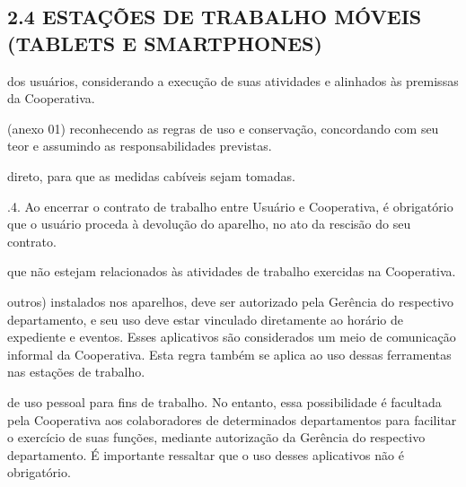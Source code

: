 \documentclass[letterpaper,10pt,brazil]{sphinxmanual}
\begin{document}
\subsection{2.4 ESTAÇÕES DE TRABALHO MÓVEIS (TABLETS E SMARTPHONES)}
\label{\detokenize{regras:id4}}\begin{description}
\sphinxAtStartPar
dos usuários, considerando a execução de suas atividades e alinhados às premissas da Cooperativa.

\sphinxAtStartPar
(anexo 01) reconhecendo as regras de uso e conservação, concordando com seu teor e assumindo as responsabilidades
previstas.

\sphinxAtStartPar
direto, para que as medidas cabíveis sejam tomadas.

\end{description}

.4. Ao encerrar o contrato de trabalho entre Usuário e Cooperativa, é obrigatório que o usuário proceda à devolução
do aparelho, no ato da rescisão do seu contrato.
\begin{description}
\sphinxAtStartPar
que não estejam relacionados às atividades de trabalho exercidas na Cooperativa.

\sphinxAtStartPar
outros) instalados nos aparelhos, deve ser autorizado pela Gerência do respectivo departamento, e seu uso deve estar
vinculado diretamente ao horário de expediente e eventos. Esses aplicativos são considerados um meio de comunicação
informal da Cooperativa. Esta regra também se aplica ao uso dessas ferramentas nas estações de trabalho.

\sphinxAtStartPar
de uso pessoal para fins de trabalho. No entanto, essa possibilidade é facultada pela Cooperativa aos colaboradores de determinados departamentos para facilitar o exercício de suas funções, mediante autorização da Gerência do respectivo departamento. É importante ressaltar que o uso desses aplicativos não é obrigatório.

\end{description}
\end{document}
